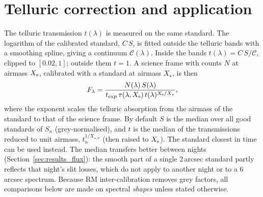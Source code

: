 \section{Telluric correction and application}
\label{sec:flux_tell}
The telluric transmission $t(\lambda)$ is measured on the same standard. The logarithm of the calibrated standard,
$C\,S$, is fitted outside the telluric bands with a smoothing spline, giving a continuum $\mathcal{C}(\lambda)$.
Inside the bands $t(\lambda)=C\,S/\mathcal{C}$, clipped to $[0.02,1]$; outside them $t=1$. A science frame with
counts $N$ at airmass $X_{\rm s}$, calibrated with a standard at airmass $X_\star$, is then
\begin{equation}
F_\lambda=\frac{N(\lambda)\,S(\lambda)}{t_{\rm exp}\,\tau(\lambda,X_{\rm s})\,t(\lambda)^{X_{\rm s}/X_\star}},
\label{eq:apply}
\end{equation}
where the exponent scales the telluric absorption from the airmass of the standard to that of the science frame. By
default $S$ is the median over all good standards of $S_n$ (grey-normalised), and $t$ is the median of the
transmissions reduced to unit airmass, $t_n^{1/X_{\star,n}}$ (then raised to $X_{\rm s}$). The standard closest in
time can be used instead. The median transfers better between
nights (Section~\ref{sec:results_flux}): the smooth part of a single 2\,arcsec standard partly reflects that night's
slit losses, which do not apply to another night or to a 6\,arcsec spectrum. Because RM inter-calibration removes
grey factors, all comparisons below are made on spectral \emph{shapes} unless stated otherwise.


